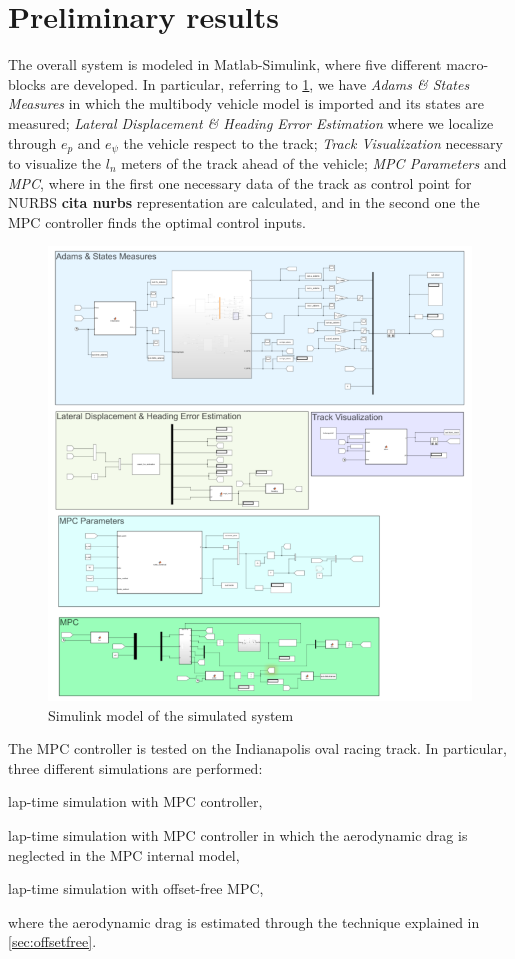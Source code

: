 \documentclass[conference]{IEEEtran} %
\begin{document}
\section{Preliminary results}
The overall system is modeled in Matlab-Simulink, where five different macro-blocks are developed. In particular, referring to \ref{fig:simulink_blocks}, we have \textit{Adams \& States Measures} in which the multibody vehicle model is imported and its states are measured; \textit{Lateral Displacement \& Heading Error Estimation} where we localize through $e_p$ and $e_\psi$ the vehicle respect to the track; \textit{Track Visualization} necessary to visualize the $l_n$ meters of the track ahead of the vehicle; \textit{MPC Parameters} and \textit{MPC}, where in the first one necessary data of the track as control point for NURBS \textbf{cita nurbs} representation are calculated, and in the second one the MPC controller finds the optimal control inputs.  
\begin{figure}[htb] \centering
	\includegraphics[width=1.\linewidth]{simulink_blocks} 
	\caption{Simulink model of the simulated system}
	\label{fig:simulink_blocks}
\end{figure}
The MPC controller is tested on the Indianapolis oval racing track. In particular, three different simulations are performed:
\begin{enumerate*}[label=(\roman*)]
	\item lap-time simulation with MPC controller,
	\item lap-time simulation with MPC controller in which the aerodynamic drag is neglected in the MPC internal model,
	\item lap-time simulation with offset-free MPC,
\end{enumerate*}
where the aerodynamic drag is estimated through the technique explained in \ref{sec:offsetfree}.
\end{document}
